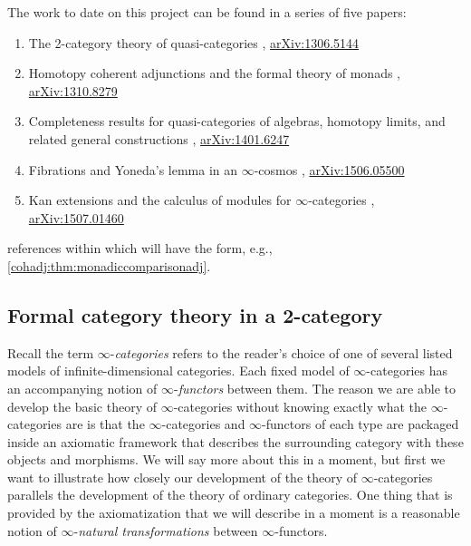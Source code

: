 \documentclass[12pt,reqno]{amsart}
\theoremstyle{plain}
\theoremstyle{definition}
\theoremstyle{remark}
\numberwithin{equation}{subsection}
\newcommand{\extRef}[3]{%
  {\protect\IfBeginWith{#3}{itm:}{}{#2.}}\ref*{#1:#3}}
\newcommand{\refII}{\extRef{cohadj}{II}}
\begin{document}
The work to date on this project can be found in a series of five papers:
\begin{enumerate}[label=\Roman*.]
\item The 2-category theory of quasi-categories \cite{RiehlVerity:2012tt}, \href{http://arxiv.org/abs/1306.5144}{ar\-Xiv:1306.5144}
\item Homotopy coherent adjunctions and the formal theory of monads \cite{RiehlVerity:2012hc},\\ \href{http://arxiv.org/abs/1310.8279}{arXiv:1310.8279}
\item Completeness results for quasi-categories of algebras, homotopy limits, and related general constructions \cite{RiehlVerity:2013cp}, \href{http://arxiv.org/abs/1401.6247}{arXiv:1401.6247}
\item Fibrations and Yoneda's lemma in an $\infty$-cosmos \cite{RiehlVerity:2015fy},  \href{http://arxiv.org/abs/1506.05500}{arXiv:1506.05500}
\item Kan extensions and the calculus of modules for $\infty$-categories \cite{RiehlVerity:2015ke}, \\ \href{http://arxiv.org/abs/1507.01460}{arXiv:1507.01460}
\end{enumerate}
references within which will have the form, e.g., \refII{thm:monadiccomparisonadj}.



\subsection{Formal category theory in a 2-category}

Recall the term $\infty$-\emph{categories} refers to the reader's choice of one of several listed models of infinite-dimensional categories. Each fixed model of $\infty$-categories has an accompanying notion of $\infty$-\emph{functors} between them. The reason we are able to develop the basic theory of $\infty$-categories without knowing exactly what the $\infty$-categories are is that 
the $\infty$-categories and $\infty$-functors of each type are packaged inside an axiomatic framework that describes the surrounding category with these objects and morphisms. We will say more about this in a moment, but first we want to illustrate how closely our development of the theory of $\infty$-categories parallels the development of the theory of ordinary categories.  One thing that is provided by the axiomatization that we will describe in a moment is a reasonable notion of $\infty$-\emph{natural transformations} between $\infty$-functors.
\end{document}
